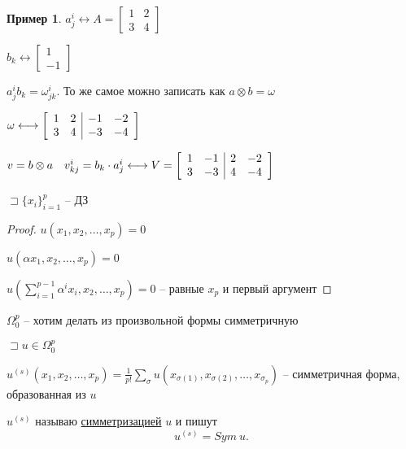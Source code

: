 \documentclass{book}
\theoremstyle{definition}
\newtheorem*{example}{Пример}
\begin{document}
         \begin{example}
             $a^i_j \longleftrightarrow A = \begin{bmatrix} 1 & 2\\ 3 & 4 \end{bmatrix} $

             $b_k \longleftrightarrow \begin{bmatrix} 1\\-1 \end{bmatrix} $

             $a^i_jb_k = \omega^i_{jk}$. То же самое можно записать как  $a\otimes b = \omega$

             $\omega \longleftrightarrow \left[
                 \begin{array}{c c | c c}
                     1 & 2 & -1 & -2\\ 3 & 4 & -3 & -4
                \end{array}
             \right]$

             $v = b\otimes a\quad v^i_{kj} = b_k\cdot a^i_j\longleftrightarrow V = \left[
                 \begin{array}{c c | c c}
                    1 & -1 & 2 & -2\\ 3 & -3 & 4 & -4
                \end{array}
             \right]$
        \end{example}



\begin{lemma}
    $\sqsupset \{x_{i} \}_{i=1}^p$ -- ДЗ
\end{lemma}
\begin{proof}
    $u(x_1, x_2, \ldots, x_p) = 0$

    $u\left( \alpha x_1, x_2, \ldots, x_p \right) = 0 $ 

    $u\left( \sum_{i=1}^{p-1} \alpha^ix_i, x_2, \ldots, x_p \right)  = 0$ -- равные $x_p$ и первый аргумент
\end{proof}

$\Omega_0^p$ -- хотим делать из произвольной формы симметричную

 $\sqsupset u\in \Omega_0^p$

 \begin{definition}
     $u^{(s)}\left( x_1, x_2, \ldots, x_p \right) = \frac{1}{p!}\sum_{\sigma} u\left( x_{\sigma(1)}, x_{\sigma(2)}, \ldots, x_{\sigma_{p}} \right) $ -- симметричная форма, образованная из $u$

     $u^{(s)}$ называю \underline{симметризацией}  $u$ и пишут  \[
         u^{(s)} = Sym~u
     .\] 
 \end{definition}
\end{document}

